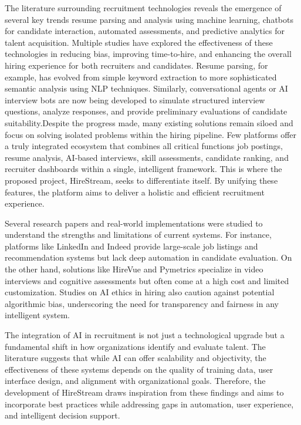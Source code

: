 \documentclass[a4paper, 12pt]{report}
\begin{document}
The literature surrounding recruitment technologies reveals the emergence of several key trends resume parsing and analysis using machine learning, chatbots for candidate interaction, automated assessments, and predictive analytics for talent acquisition. Multiple studies have explored the effectiveness of these technologies in reducing bias, improving time-to-hire, and enhancing the overall hiring experience for both recruiters and candidates. Resume parsing, for example, has evolved from simple keyword extraction to more sophisticated semantic analysis using NLP techniques. Similarly, conversational agents or AI interview bots are now being developed to simulate structured interview questions, analyze responses, and provide preliminary evaluations of candidate suitability.Despite the progress made, many existing solutions remain siloed and focus on solving isolated problems within the hiring pipeline. Few platforms offer a truly integrated ecosystem that combines all critical functions job postings, resume analysis, AI-based interviews, skill assessments, candidate ranking, and recruiter dashboards within a single, intelligent framework. This is where the proposed project, HireStream, seeks to differentiate itself. By unifying these features, the platform aims to deliver a holistic and efficient recruitment experience.

Several research papers and real-world implementations were studied to understand the strengths and limitations of current systems. For instance, platforms like LinkedIn and
Indeed provide large-scale job listings and recommendation systems but lack deep automation in candidate evaluation. On the other hand, solutions like HireVue and Pymetrics specialize in video interviews and cognitive assessments but often come at a high cost and limited customization. Studies on AI ethics in hiring also caution against potential algorithmic bias, underscoring the need for transparency and fairness in any intelligent system.

The integration of AI in recruitment is not just a technological upgrade but a fundamental shift in how organizations identify and evaluate talent. The literature suggests that while AI can offer scalability and objectivity, the effectiveness of these systems depends on the quality of training data, user interface design, and alignment with organizational goals. Therefore, the development of HireStream draws inspiration from these findings and aims to incorporate best practices while addressing gaps in automation, user experience, and intelligent decision support.
\end{document}
